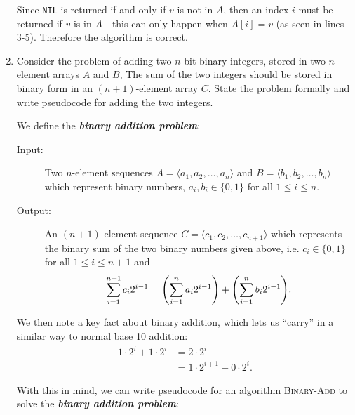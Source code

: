 \documentclass[Chapter02]{subfiles}
\begin{document}
\begin{enumerate}
\begin{answer}
			Since \texttt{NIL} is returned if and only if $v$ is not in $A$, then an index $i$ must be returned if $v$ is in $A$ - this can only happen when $A[i] = v$ (as seen in lines 3-5). Therefore the algorithm is correct.
		\end{answer}

		\item Consider the problem of adding two $n$-bit binary integers, stored in two $n$-element arrays $A$ and $B$, The sum of the two integers should be stored in binary form in an $(n + 1)$-element array $C$. State the problem formally and write pseudocode for adding the two integers.
		\begin{answer}
			We define the \textbf{\textit{binary addition problem}}:
			\begin{description}
				\item[Input:] Two $n$-element sequences $A = \langle a_1, a_2, \dots, a_n \rangle$ and $B = \langle b_1, b_2, \dots, b_n \rangle$ which represent binary numbers, $a_i,b_i \in \{0, 1\}$ for all $1 \leq i \leq n$.

				\item[Output:] An $(n + 1)$-element sequence $C = \langle c_1, c_2, \dots, c_{n + 1} \rangle$ which represents the binary sum of the two binary numbers given above, i.e. $c_i \in \{0, 1\}$ for all $1 \leq i \leq n + 1$ and
				\[
					\sum_{i = 1}^{n + 1} c_i2^{i - 1} = \qty(\sum_{i = 1}^{n} a_i2^{i - 1}) + \qty(\sum_{i = 1}^{n} b_i2^{i - 1}).
				\]
			\end{description}

			We then note a key fact about binary addition, which lets us ``carry'' in a similar way to normal base 10 addition:
			\begin{align}
				1\cdot2^i + 1\cdot2^i &= 2\cdot2^i \nonumber\\
				                      &= 1\cdot2^{i + 1} + 0\cdot2^i. \label{eq:ch02-binary-add-carry}
			\end{align}

			With this in mind, we can write pseudocode for an algorithm \textsc{Binary-Add} to solve the \textbf{\textit{binary addition problem}}:

			\begin{algorithm}[H]

			\end{algorithm}


\end{answer}
\end{enumerate}
\end{document}
